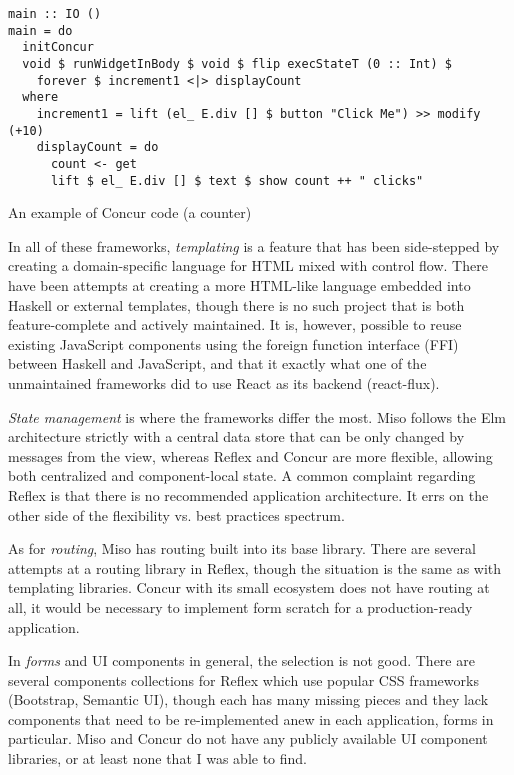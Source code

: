\documentclass[english,odsaz]{fitthesis}
\begin{document}
\begin{listing}[htbp]
\begin{verbatim}
main :: IO ()
main = do
  initConcur
  void $ runWidgetInBody $ void $ flip execStateT (0 :: Int) $
    forever $ increment1 <|> displayCount
  where
    increment1 = lift (el_ E.div [] $ button "Click Me") >> modify (+10)
    displayCount = do
      count <- get
      lift $ el_ E.div [] $ text $ show count ++ " clicks"
\end{verbatim}
\caption{An example of Concur code (a counter) \label{ex-concur}}
\end{listing}

In all of these frameworks, \emph{templating} is a feature that has been side-stepped
by creating a domain-specific language for HTML mixed with control flow. There
have been attempts at creating a more HTML-like language embedded into Haskell
or external templates, though there is no such project that is both
feature-complete and actively maintained. It is, however, possible to reuse
existing JavaScript components using the foreign function interface (FFI)
between Haskell and JavaScript, and that it exactly what one of the unmaintained
frameworks did to use React as its backend (react-flux).

\emph{State management} is where the frameworks differ the most. Miso follows the Elm
architecture strictly with a central data store that can be only changed by
messages from the view, whereas Reflex and Concur are more flexible, allowing
both centralized and component-local state. A common complaint regarding Reflex
is that there is no recommended application architecture. It errs on the other
side of the flexibility vs. best practices spectrum.

As for \emph{routing}, Miso has routing built into its base library. There are several
attempts at a routing library in Reflex, though the situation is the same as
with templating libraries. Concur with its small ecosystem does not have routing
at all, it would be necessary to implement form scratch for a production-ready
application.

In \emph{forms} and UI components in general, the selection is not good. There are
several components collections for Reflex which use popular CSS frameworks
(Bootstrap, Semantic UI), though each has many missing pieces and they lack
components that need to be re-implemented anew in each application, forms in
particular. Miso and Concur do not have any publicly available UI component
libraries, or at least none that I was able to find.
\end{document}
